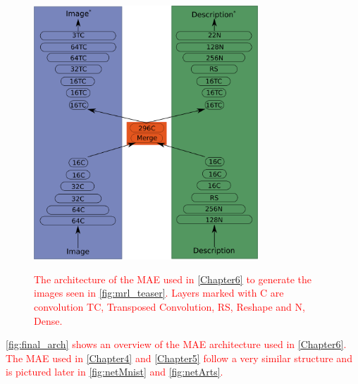 \begin{figure}
\centering
\includegraphics[width=0.75\textwidth]{Figs/shapes/maeArch.png}
\label{fig:final_arch}
\caption{\textcolor{red}{The architecture of the MAE used in \autoref{Chapter6} to generate the images seen in \autoref{fig:mrl_teaser}. Layers marked with C are convolution TC, Transposed Convolution, RS, Reshape and N, Dense.}}
\end{figure}

\textcolor{red}{\autoref{fig:final_arch} shows an overview of the \ac{MAE} architecture used in \autoref{Chapter6}. The \ac{MAE} used in \autoref{Chapter4} and \autoref{Chapter5} follow a very similar structure and is pictured later in \autoref{fig:netMnist} and \autoref{fig:netArts}.} 











